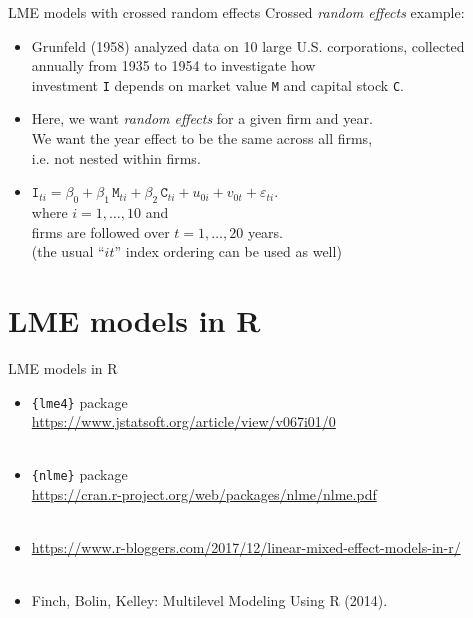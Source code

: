 \documentclass{beamer}
\begin{document}
\begin{frame}{LME models with crossed random effects}
Crossed \textit{random effects} example:\\
\medskip
\begin{itemize}
\item Grunfeld (1958) analyzed data on 10 large U.S. corporations,
collected annually from 1935 to 1954 to investigate how \\investment \texttt{I} depends on market value \texttt{M} and capital stock \texttt{C}.\\
\medskip
\item Here, we want \textit{random effects} for a given firm and year.\\
\smallskip
We want the year effect to be the same across all firms, \\i.e. not nested within firms.
\bigskip
\item $\texttt{I}_{ti} = \beta_0 + \beta_1 \, \texttt{M}_{ti} 
+ \beta_2 \, \texttt{C}_{ti} + u_{0i} + v_{0t} + \varepsilon_{ti}.$\\
\medskip
where $i=1, \dots, 10$ and \\firms are followed over $t=1,\dots,20$ years.
\\(the usual ``$it$'' index ordering can be used as well)
\end{itemize}
\end{frame}
\section{LME models in R}
\begin{frame}{LME models in R}
\begin{itemize}
    \item \texttt{\{lme4\}} package \\ \smallskip
    \url{https://www.jstatsoft.org/article/view/v067i01/0}\\~\\
    \bigskip 
    \item \texttt{\{nlme\}} package \\ \smallskip
    \url{https://cran.r-project.org/web/packages/nlme/nlme.pdf}\\~\\
    \bigskip
    \item \url{https://www.r-bloggers.com/2017/12/linear-mixed-effect-models-in-r/}\\~\\
    \bigskip
    \item Finch, Bolin, Kelley: Multilevel Modeling Using R (2014).
\end{itemize}
\end{frame}
\end{document}
